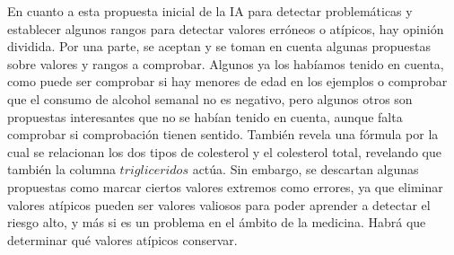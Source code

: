 \documentclass[12pt,a4paper,oneside]{book}
\begin{document}
\begin{iaanalisis}
En cuanto a esta propuesta inicial de la IA para detectar problemáticas y establecer algunos rangos para detectar valores erróneos o atípicos, hay opinión dividida. Por una parte, se aceptan y se toman en cuenta algunas propuestas sobre valores y rangos a comprobar. Algunos ya los habíamos tenido en cuenta, como puede ser comprobar si hay menores de edad en los ejemplos o comprobar que el consumo de alcohol semanal no es negativo, pero algunos otros son propuestas interesantes que no se habían tenido en cuenta, aunque falta comprobar si comprobación tienen sentido. También revela una fórmula por la cual se relacionan los dos tipos de colesterol y el colesterol total, revelando que también la columna $trigliceridos$ actúa. Sin embargo, se descartan algunas propuestas como marcar ciertos valores extremos como errores, ya que eliminar valores atípicos pueden ser valores valiosos para poder aprender a detectar el riesgo alto, y más si es un problema en el ámbito de la medicina. Habrá que determinar qué valores atípicos conservar.
\end{iaanalisis}
\end{document}
